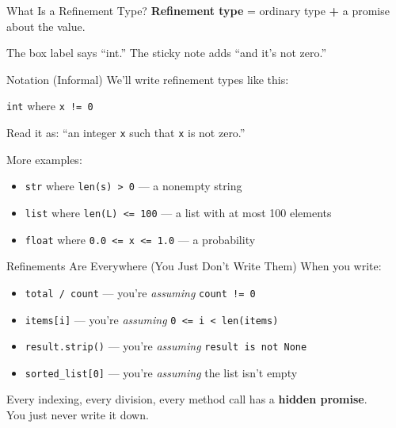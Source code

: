 \documentclass[aspectratio=169,10pt]{beamer}
\begin{document}
\begin{frame}{What Is a Refinement Type?}
\textbf{Refinement type} = ordinary type \textbf{+} a promise about the value.
\vspace{0.5em}
\begin{center}
\end{center}
\vspace{0.3em}
The box label says ``int.'' The sticky note adds ``and it's not zero.''
\end{frame}

\begin{frame}{Notation (Informal)}
We'll write refinement types like this:
\vspace{0.5em}
\begin{center}
\texttt{int} where \texttt{x != 0}
\end{center}
\vspace{0.3em}
Read it as: ``an integer \texttt{x} such that \texttt{x} is not zero.''
\vspace{0.5em}

More examples:
\begin{itemize}
  \item \texttt{str} where \texttt{len(s) > 0} — a nonempty string
  \item \texttt{list} where \texttt{len(L) <= 100} — a list with at most 100 elements
  \item \texttt{float} where \texttt{0.0 <= x <= 1.0} — a probability
\end{itemize}
\end{frame}

\begin{frame}{Refinements Are Everywhere (You Just Don't Write Them)}
When you write:
\vspace{0.3em}
\begin{itemize}
  \item \texttt{total / count} — you're \emph{assuming} \texttt{count != 0}
  \item \texttt{items[i]} — you're \emph{assuming} \texttt{0 <= i < len(items)}
  \item \texttt{result.strip()} — you're \emph{assuming} \texttt{result is not None}
  \item \texttt{sorted\_list[0]} — you're \emph{assuming} the list isn't empty
\end{itemize}
\vspace{0.3em}
Every indexing, every division, every method call has a \textbf{hidden promise}.\\
You just never write it down.
\end{frame}
\end{document}
